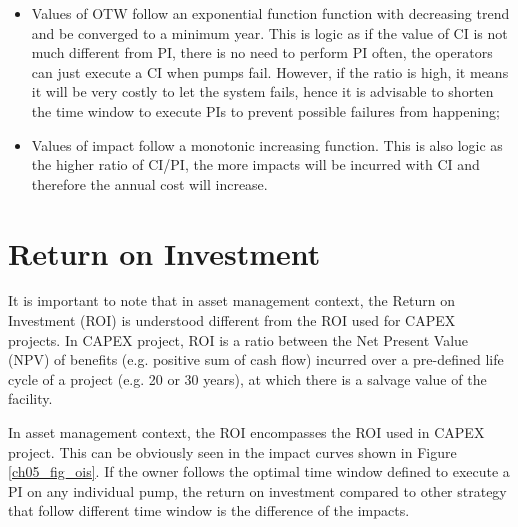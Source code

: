 \begin{itemize}
	\item Values of OTW follow an exponential function function with decreasing trend and be converged to a minimum year. This is logic as if the value of CI is not much different from PI, there is no need to perform PI often, the operators can just execute a CI when pumps fail. However, if the ratio is high, it means it will be very costly to let the system fails, hence it is advisable to shorten the time window to execute PIs to prevent possible failures from happening;

	\item Values of impact follow a monotonic increasing function. This is also logic as the higher ratio of CI/PI, the more impacts will be incurred with CI and therefore the annual cost will increase.
\end{itemize}

\section{Return on Investment}
It is important to note that in asset management context, the Return on Investment (ROI) is understood different from the ROI used for CAPEX projects. In CAPEX project, ROI is a ratio between the Net Present Value (NPV) of benefits (e.g. positive sum of cash flow) incurred over a pre-defined life cycle of a project (e.g. 20 or 30 years), at which there is a salvage value of the facility.

In asset management context, the ROI encompasses the ROI used in CAPEX project. This can be obviously seen in the impact curves shown in Figure \ref{ch05_fig_ois}. If the owner follows the optimal time window defined to execute a PI on any individual pump, the return on investment compared to other strategy that follow different time window is the difference of the impacts.

